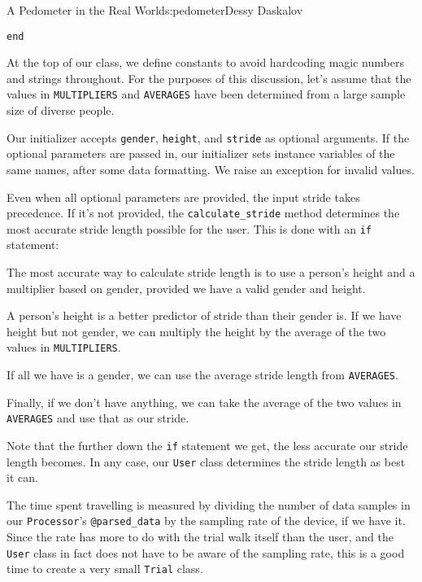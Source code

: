 \begin{aosachapter}{A Pedometer in the Real World}{s:pedometer}{Dessy Daskalov}
\begin{verbatim}
end
\end{verbatim}

At the top of our class, we define constants to avoid hardcoding magic
numbers and strings throughout. For the purposes of this discussion,
let's assume that the values in \texttt{MULTIPLIERS} and
\texttt{AVERAGES} have been determined from a large sample size of
diverse people.

Our initializer accepts \texttt{gender}, \texttt{height}, and
\texttt{stride} as optional arguments. If the optional parameters are
passed in, our initializer sets instance variables of the same names,
after some data formatting. We raise an exception for invalid values.

Even when all optional parameters are provided, the input stride takes
precedence. If it's not provided, the \texttt{calculate\_stride} method
determines the most accurate stride length possible for the user. This
is done with an \texttt{if} statement:

\begin{aosaitemize}

\item
  The most accurate way to calculate stride length is to use a person's
  height and a multiplier based on gender, provided we have a valid
  gender and height.
\item
  A person's height is a better predictor of stride than their gender
  is. If we have height but not gender, we can multiply the height by
  the average of the two values in \texttt{MULTIPLIERS}.
\item
  If all we have is a gender, we can use the average stride length from
  \texttt{AVERAGES}.
\item
  Finally, if we don't have anything, we can take the average of the two
  values in \texttt{AVERAGES} and use that as our stride.
\end{aosaitemize}

Note that the further down the \texttt{if} statement we get, the less
accurate our stride length becomes. In any case, our \texttt{User} class
determines the stride length as best it can.

\label{elapsed-time}

The time spent travelling is measured by dividing the number of data
samples in our \texttt{Processor}'s \texttt{@parsed\_data} by the
sampling rate of the device, if we have it. Since the rate has more to
do with the trial walk itself than the user, and the \texttt{User} class
in fact does not have to be aware of the sampling rate, this is a good
time to create a very small \texttt{Trial} class.


\end{aosachapter}
